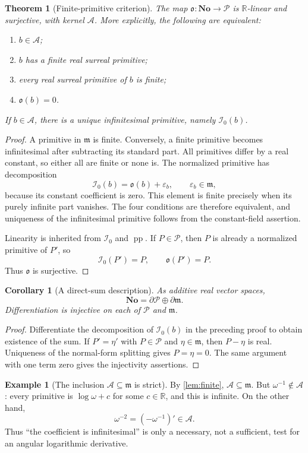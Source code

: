 \documentclass[11pt,letterpaper]{article}
\numberwithin{equation}{section}
\newtheorem{theorem}{Theorem}[section]
\newtheorem{corollary}[corollary]{Corollary}
\theoremstyle{definition}
\newtheorem{example}[example]{Example}
\theoremstyle{remark}
\newcommand{\No}{\mathbf{No}}
\newcommand{\R}{\mathbb R}
\newcommand{\mm}{\mathfrak m}
\newcommand{\PPi}{\mathcal P}
\newcommand{\ARate}{\mathcal A}
\newcommand{\der}{\partial}
\newcommand{\pp}{\operatorname{pp}}
\newcommand{\Izero}{\mathcal I_0}
\newcommand{\Obs}{\mathfrak o}
\newcommand{\eps}{\varepsilon}
\begin{document}
\begin{theorem}[Finite-primitive criterion]\label{thm:obs}
The map $\Obs:\No\to\PPi$ is $\R$-linear and surjective, with kernel $\ARate$. More explicitly, the following are equivalent:
\begin{enumerate}
\item $b\in\ARate$;
\item $b$ has a finite real surreal primitive;
\item every real surreal primitive of $b$ is finite;
\item $\Obs(b)=0$.
\end{enumerate}
If $b\in\ARate$, there is a unique infinitesimal primitive, namely $\Izero(b)$.
\end{theorem}
\begin{proof}
A primitive in $\mm$ is finite. Conversely, a finite primitive becomes infinitesimal after subtracting its standard part. All primitives differ by a real constant, so either all are finite or none is. The normalized primitive has decomposition
\[
 \Izero(b)=\Obs(b)+\eps_b,
 \qquad\eps_b\in\mm,
\]
because its constant coefficient is zero. This element is finite precisely when its purely infinite part vanishes. The four conditions are therefore equivalent, and uniqueness of the infinitesimal primitive follows from the constant-field assertion.

Linearity is inherited from $\Izero$ and $\pp$. If $P\in\PPi$, then $P$ is already a normalized primitive of $P'$, so
\begin{equation}\label{eq:obsP}
 \Izero(P')=P,\qquad\Obs(P')=P.
\end{equation}
Thus $\Obs$ is surjective.
\end{proof}

\begin{corollary}[A direct-sum description]\label{cor:direct}
As additive real vector spaces,
\[
 \No=\der\PPi\oplus\der\mm.
\]
Differentiation is injective on each of $\PPi$ and $\mm$.
\end{corollary}
\begin{proof}
Differentiate the decomposition of $\Izero(b)$ in the preceding proof to obtain existence of the sum. If $P'=\eta'$ with $P\in\PPi$ and $\eta\in\mm$, then $P-\eta$ is real. Uniqueness of the normal-form splitting gives $P=\eta=0$. The same argument with one term zero gives the injectivity assertions.
\end{proof}

\begin{example}[The inclusion $\ARate\subseteq\mm$ is strict]\label{ex:strict}
By \cref{lem:finite}, $\ARate\subseteq\mm$. But $\omega^{-1}\notin\ARate$: every primitive is $\log\omega+c$ for some $c\in\R$, and this is infinite. On the other hand,
\[
 \omega^{-2}=(-\omega^{-1})'\in\ARate.
\]
Thus ``the coefficient is infinitesimal'' is only a necessary, not a sufficient, test for an angular logarithmic derivative.
\end{example}
\end{document}

